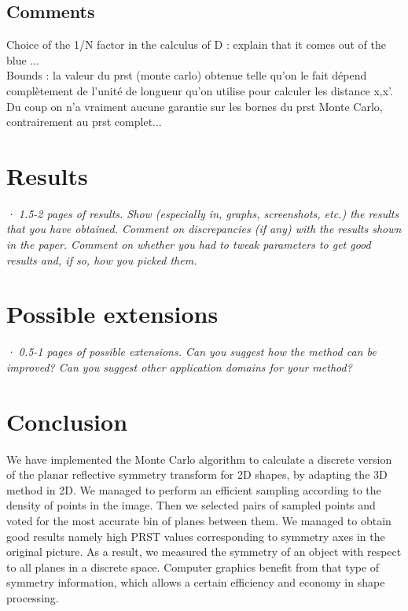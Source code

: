 \documentclass[10pt,a4paper]{article}			%
\begin{document}
  	\subsection{Comments}
  	Choice of the 1/N factor in the calculus of D : explain that it comes out of the blue ... \\
  	
  	Bounds : la valeur du prst (monte carlo) obtenue telle qu'on le fait dépend complètement de l'unité de longueur qu'on utilise pour calculer les distance x,x'. Du coup on n'a vraiment aucune garantie sur les bornes du prst Monte Carlo, contrairement au prst complet...\\
  	
  	
  	\section{Results}
\textit{· 1.5-2 pages of results. Show (especially in, graphs, screenshots, etc.) the results that you have obtained. Comment on discrepancies (if any) with the results shown in the paper. Comment on whether you had to tweak parameters to get good results and, if so, how you picked them.\\}

	\section{Possible extensions}
	
\textit{· 0.5-1 pages of possible extensions. Can you suggest how the method can be improved? Can you suggest other application domains for your method?\\}

	\section*{Conclusion}
We have implemented the Monte Carlo algorithm to calculate a discrete version of the planar reflective symmetry transform for 2D shapes, by adapting the 3D method in 2D. We managed to perform an efficient sampling according to the density of points in the image. Then we selected pairs of sampled points and voted for the most accurate bin of planes between them. We managed to obtain good results namely high PRST values corresponding to symmetry axes in the original picture. As a result, we measured the symmetry of an object with respect to all planes in a discrete space. Computer graphics benefit from that type of symmetry information, which allows a certain efficiency and economy in shape processing.

\nocite{*}


		
\end{document}
